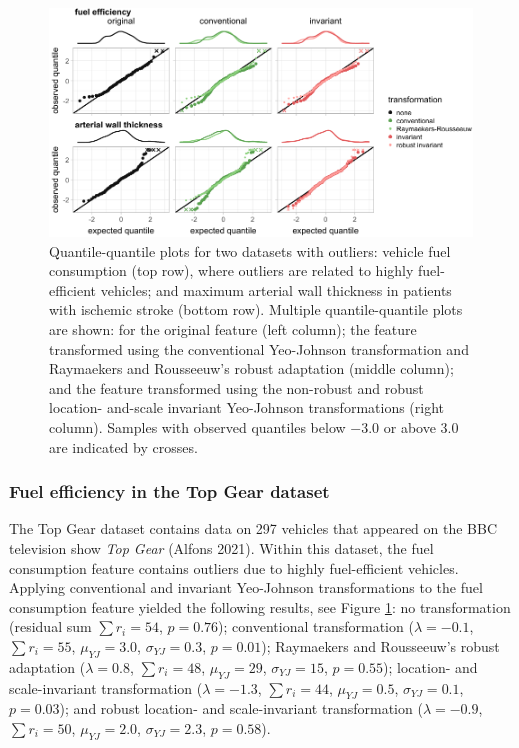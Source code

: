 \documentclass[
  a4paper,
]{article}
\begin{document}
\begin{figure}

{\centering \includegraphics{manuscript_files/figure-latex/experimental-results-outlier-robustness-1} 

}

\caption{Quantile-quantile plots for two datasets with outliers: vehicle fuel consumption (top row), where outliers are related to highly fuel-efficient vehicles; and maximum arterial wall thickness in patients with ischemic stroke (bottom row). Multiple quantile-quantile plots are shown: for the original feature (left column); the feature transformed using the conventional Yeo-Johnson transformation and Raymaekers and Rousseeuw's robust adaptation (middle column); and the feature transformed using the non-robust and robust location- and-scale invariant Yeo-Johnson transformations (right column). Samples with observed quantiles below $-3.0$ or above $3.0$ are indicated by crosses.}\label{fig:experimental-results-outlier-robustness}
\end{figure}

\subsubsection{Fuel efficiency in the Top Gear
dataset}\label{fuel-efficiency-in-the-top-gear-dataset}

The Top Gear dataset contains data on 297 vehicles that appeared on the
BBC television show \emph{Top Gear} (Alfons 2021). Within this dataset,
the fuel consumption feature contains outliers due to highly
fuel-efficient vehicles. Applying conventional and invariant Yeo-Johnson
transformations to the fuel consumption feature yielded the following
results, see Figure \ref{fig:experimental-results-outlier-robustness}:
no transformation (residual sum \(\sum r_i = 54\), \(p=0.76\));
conventional transformation (\(\lambda = -0.1\), \(\sum r_i = 55\),
\(\mu_{YJ} = 3.0\), \(\sigma_{YJ} = 0.3\), \(p=0.01\)); Raymaekers and
Rousseeuw's robust adaptation (\(\lambda = 0.8\), \(\sum r_i = 48\),
\(\mu_{YJ} = 29\), \(\sigma_{YJ} = 15\), \(p=0.55\)); location- and
scale-invariant transformation (\(\lambda = -1.3\), \(\sum r_i = 44\),
\(\mu_{YJ} = 0.5\), \(\sigma_{YJ} = 0.1\), \(p=0.03\)); and robust
location- and scale-invariant transformation (\(\lambda = -0.9\),
\(\sum r_i = 50\), \(\mu_{YJ} = 2.0\), \(\sigma_{YJ} = 2.3\),
\(p=0.58\)).
\end{document}
